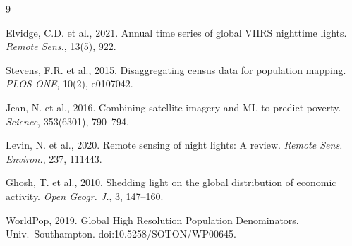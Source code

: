 \documentclass[a4paper, 9pt, twocolumn]{article}
\begin{document}
\vspace{-2pt}
{\footnotesize
\begin{thebibliography}{9}

Elvidge, C.D. et al., 2021. Annual time series of global VIIRS nighttime lights. \textit{Remote Sens.}, 13(5), 922.

Stevens, F.R. et al., 2015. Disaggregating census data for population mapping. \textit{PLOS ONE}, 10(2), e0107042.

Jean, N. et al., 2016. Combining satellite imagery and ML to predict poverty. \textit{Science}, 353(6301), 790--794.

Levin, N. et al., 2020. Remote sensing of night lights: A review. \textit{Remote Sens. Environ.}, 237, 111443.

Ghosh, T. et al., 2010. Shedding light on the global distribution of economic activity. \textit{Open Geogr. J.}, 3, 147--160.

WorldPop, 2019. Global High Resolution Population Denominators. Univ.\ Southampton. doi:10.5258/SOTON/WP00645.

\end{thebibliography}
}
\end{document}
